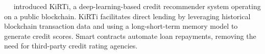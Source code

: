 \documentclass[runningheads]{llncs}
\begin{document}





~\citeauthor{patel2020kirti}~\cite{patel2020kirti} introduced KiRTi, a deep-learning-based credit recommender system operating on a public blockchain. KiRTi facilitates direct lending by leveraging historical blockchain transaction data and using a long-short-term memory model to generate credit scores. Smart contracts automate loan repayments, removing the need for third-party credit rating agencies. %
\end{document}
